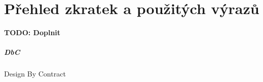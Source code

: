 \chapter*{Přehled zkratek a použitých výrazů}
\textbf{\textcolor{pblue}{TODO: Doplnit}}\\
\paragraph{DbC}
Design By Contract

